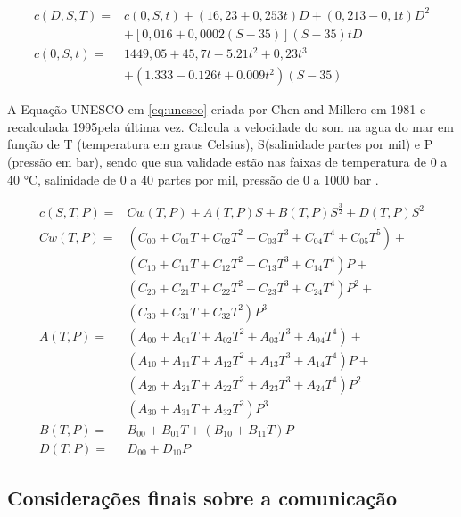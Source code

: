 \begin{equation}
\begin{aligned}
	c(D,S,T) = & c(0,S,t) + (16,23 + 0,253t)D + (0,213 - 0,1t)D^2\\ & + [0,016 + 0,0002(S-35)](S-35)tD\\	
	c(0,S,t) = & 1449,05 + 45,7t - 5.21t^2 + 0,23t^3\\ & +(1.333 - 0.126t + 0.009t^2)(S-35)
\end{aligned}
\label{eq:coppens}
\end{equation}

A Equação UNESCO em \ref{eq:unesco} criada por Chen and Millero em 1981 e recalculada 1995pela última vez. Calcula a velocidade do som na agua do mar em função de T (temperatura em graus Celsius), S(salinidade partes por mil) e P (pressão em bar), sendo que sua validade estão nas faixas de temperatura de 0 a 40 °C, salinidade de 0 a 40 partes por mil, pressão de 0 a 1000 bar \cite{simpy}.

\begin{equation}
	\begin{aligned}
		c(S,T,P) = & Cw(T,P) + A(T,P)S + B(T,P)S^{\frac{3}{2}} + D(T,P)S^2\\	
		Cw(T,P) = & (C_{00} + C_{01}T + C_{02}T^2 + C_{03}T^3 + C_{04}T^4 + C_{05}T^5)+\\
		& (C_{10} + C_{11}T + C_{12}T^2 + C_{13}T^3 + C_{14}T^4)P+\\
		& (C_{20} + C_{21}T + C_{22}T^2 + C_{23}T^3 + C_{24}T^4)P^2+\\
		& (C_{30} + C_{31}T + C_{32}T^2)P^3\\
		A(T,P) = & (A_{00} + A_{01}T + A_{02}T^2 + A_{03}T^3 + A_{04}T^4)+\\
		& (A_{10} + A_{11}T + A_{12}T^2 + A_{13}T^3 + A_{14}T^4)P+\\
		& (A_{20} + A_{21}T + A_{22}T^2 + A_{23}T^3 + A_{24}T^4)P^2\\
		& (A_{30} + A_{31}T + A_{32}T^2)P^3\\
		B(T,P) = & B_{00} + B_{01}T + (B_{10} + B_{11}T)P\\
		D(T,P) = & D_{00} + D_{10}P
	\end{aligned}
	\label{eq:unesco}
\end{equation}


\subsection{Considerações finais sobre a comunicação}


